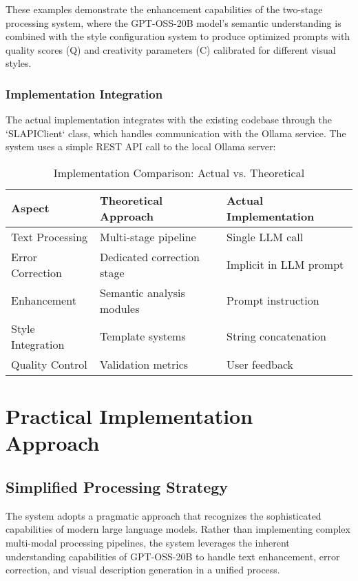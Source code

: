 These examples demonstrate the enhancement capabilities of the two-stage processing system, where the GPT-OSS-20B model's semantic understanding is combined with the style configuration system to produce optimized prompts with quality scores (Q) and creativity parameters (C) calibrated for different visual styles.

\subsubsection{Implementation Integration}

The actual implementation integrates with the existing codebase through the `SLAPIClient` class, which handles communication with the Ollama service. The system uses a simple REST API call to the local Ollama server:

\begin{table}[H]
\centering
\caption{Implementation Comparison: Actual vs. Theoretical}
\label{tab:implementation_comparison}
{\begin{tabular}{lll}
\toprule
\textbf{Aspect} & \textbf{Theoretical Approach} & \textbf{Actual Implementation} \\
\midrule
Text Processing & Multi-stage pipeline & Single LLM call \\
Error Correction & Dedicated correction stage & Implicit in LLM prompt \\
Enhancement & Semantic analysis modules & Prompt instruction \\
Style Integration & Template systems & String concatenation \\
Quality Control & Validation metrics & User feedback \\
\bottomrule
\end{tabular}}
\end{table}

\section{Practical Implementation Approach}

\subsection{Simplified Processing Strategy}

The system adopts a pragmatic approach that recognizes the sophisticated capabilities of modern large language models. Rather than implementing complex multi-modal processing pipelines, the system leverages the inherent understanding capabilities of GPT-OSS-20B to handle text enhancement, error correction, and visual description generation in a unified process.

